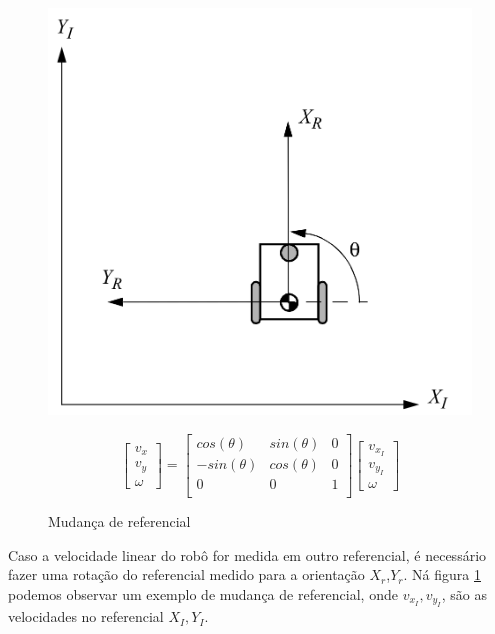 \begin{figure}[H]
    \centering
    \includegraphics[scale=0.28]{figuras/robo_coordenadas.png}
   
    \[
    \begin{bmatrix}
        v_x \\
        v_y \\
        \omega
    \end{bmatrix}
    =
    \begin{bmatrix}
        cos(\theta)  & sin(\theta) & 0 \\
        -sin(\theta) & cos(\theta) & 0 \\
        0 & 0 & 1 \\
    \end{bmatrix}
    \begin{bmatrix}
        v_{x_I} \\
        v_{y_I} \\
        \omega
    \end{bmatrix}
\]
\caption{Mudança de referencial}
\label{fig:mudanca:referencial}
\end{figure}

Caso a velocidade linear do robô for medida em outro
referencial, é necessário fazer uma rotação do referencial
medido para a orientação $X_r$,$Y_r$. Ná figura \ref{fig:mudanca:referencial}
podemos observar um exemplo de mudança de referencial,
onde $v_{x_I}, v_{y_I}$, são as velocidades no referencial $X_I,Y_I$.

